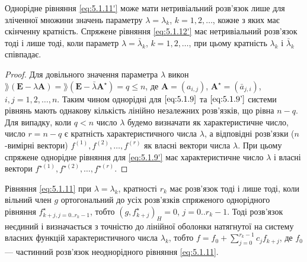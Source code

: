 \begin{theorem}
    Однорідне рівняння \eqref{eq:5.1.11'} може мати нетривіальний розв'язок лише для зліченної множини значень параметру $\lambda = \lambda_k$, $k = 1, 2, \ldots$, кожне з яких має скінченну кратність. Спряжене рівняння \eqref{eq:5.1.12'} має нетривіальний розв'язок тоді і лише тоді, коли параметр $\lambda = \bar \lambda_k$, $k = 1, 2, \ldots$, при цьому кратність $\lambda_k$ і $\bar \lambda_k$ співпадає.
\end{theorem}

\begin{proof}
    Для довільного значення параметра $\lambda$ викон $\rang (\textbf{E} - \lambda \textbf{A}) = \rang (\textbf{E} - \bar \lambda \textbf{A}^\star) = q \le n$, де $\textbf{A} = (a_{i, j})$, $\textbf{A}^\star = (\bar a_{j, i})$, $i, j = 1, 2, \ldots, n$. Таким чином однорідні для $\eqref{eq:5.1.9}$ та $\eqref{eq:5.1.9'}$ системи рівнянь мають однакову кількість лінійно незалежних розв'язків, що рівна $n - q$. Для випадку, коли $q < n$ число $\lambda$ будемо визначати як характеристичне число, число $r = n - q$ є кратність характеристичного числа $\lambda$, а відповідні розв'язки ($n$-вимірні вектори) $f^{(1)}, f^{(2)}, \ldots, f^{(r)}$ як власні вектори числа $\lambda$. При цьому спряжене однорідне рівняння для \eqref{eq:5.1.9'} має характеристичне число $\lambda$ і власні вектори $f^{\star(1)}, f^{\star(2)}, \ldots, f^{\star(r)}$.
\end{proof}

\begin{theorem}
    Рівняння \eqref{eq:5.1.11} при $\lambda = \lambda_k$, кратності $r_k$ має розв'язок тоді і лише тоді, коли вільний член $g$ ортогональний до усіх розв'язків спряженого однорідного рівняння $f_{k + j, j = 0..r_k-1}^\star$, тобто $(g, f_{k+j}^\star)_H = 0$, $j=0..r_k-1$. Тоді розв'язок неєдиний і визначається з точністю до лінійної оболонки натягнутої на систему власних функцій характеристичного числа $\lambda_k$, тобто $f = f_0 + \sum_{j = 0}^{r_k - 1} c_j f_{k + j}$, де $f_0$ --- частинний розв'язок неоднорідного рівняння \eqref{eq:5.1.11}.
\end{theorem}

